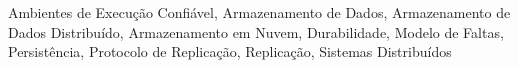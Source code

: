 \acresetall

\noindent
Ambientes de Execução Confiável,
Armazenamento de Dados,
Armazenamento de Dados Distribuído,
Armazenamento em Nuvem,
Durabilidade,
Modelo de Faltas,
Persistência,
Protocolo de Replicação,
Replicação,
Sistemas Distribuídos
